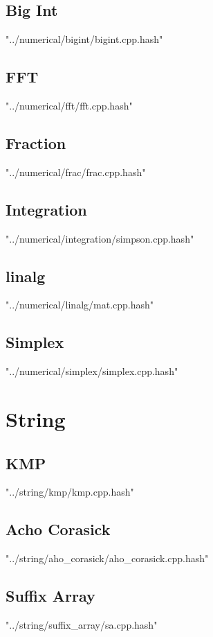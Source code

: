 \documentclass [12pt,onecolumn,oneside]{article}
\begin{document}
\subsection{ Big Int}
 {"../numerical/bigint/bigint.cpp.hash"}
\subsection{ FFT}
 {"../numerical/fft/fft.cpp.hash"}
\subsection{ Fraction}
 {"../numerical/frac/frac.cpp.hash"}
\subsection{ Integration}
 {"../numerical/integration/simpson.cpp.hash"}
\subsection{ linalg}
 {"../numerical/linalg/mat.cpp.hash"}
\subsection{ Simplex}
 {"../numerical/simplex/simplex.cpp.hash"}
\newpage

\section{String}
\subsection{ KMP}
 {"../string/kmp/kmp.cpp.hash"}
\subsection{ Acho Corasick}
 {"../string/aho_corasick/aho_corasick.cpp.hash"}
\subsection{ Suffix Array}
 {"../string/suffix_array/sa.cpp.hash"}
\newpage
\end{document}

